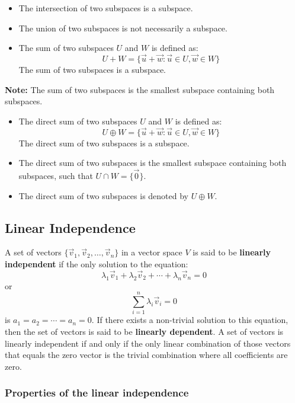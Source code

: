 \begin{itemize}[label=\(-\)]
	\item The intersection of two subspaces is a subspace.
	\item The union of two subspaces is not necessarily a subspace.
	\item The sum of two subspaces \(U\) and \(W\) is defined as:
	      \[
		      U + W = \{\vec{u} + \vec{w} : \vec{u} \in U, \vec{w} \in W\}
	      \]
	      The sum of two subspaces is a subspace.
\end{itemize}
\textbf{Note:} The sum of two subspaces is the smallest subspace containing both subspaces.
\begin{itemize}[label=\(-\)]
	\item The direct sum of two subspaces \(U\) and \(W\) is defined as:
	      \[
		      U \oplus W = \{\vec{u} + \vec{w} : \vec{u} \in U, \vec{w} \in W\}
	      \]
	      The direct sum of two subspaces is a subspace.
	\item The direct sum of two subspaces is the smallest subspace containing both subspaces, such that \(U \cap W = \{\vec{0}\}\).
	\item The direct sum of two subspaces is denoted by \(U \oplus W\).
\end{itemize}

\subsection{Linear Independence}

A set of vectors \(\{\vec{v}_1, \vec{v}_2, \dots, \vec{v}_n\}\) in a vector space \(V\) is said to be \textbf{linearly independent} if the only solution to the equation:
\[
	\lambda_1\vec{v}_1 + \lambda_2\vec{v}_2 + \cdots + \lambda_n\vec{v}_n = 0
\]
or
\[
	\sum_{i=1}^n \lambda_i \vec{v}_i = 0
\]
is \(a_1 = a_2 = \cdots = a_n = 0\).
If there exists a non-trivial solution to this equation, then the set of vectors is said to be \textbf{linearly dependent}.
A set of vectors is linearly independent if and only if the only linear combination of those vectors that equals the zero vector is the trivial combination where all coefficients are zero.

\subsubsection{Properties of the linear independence}

